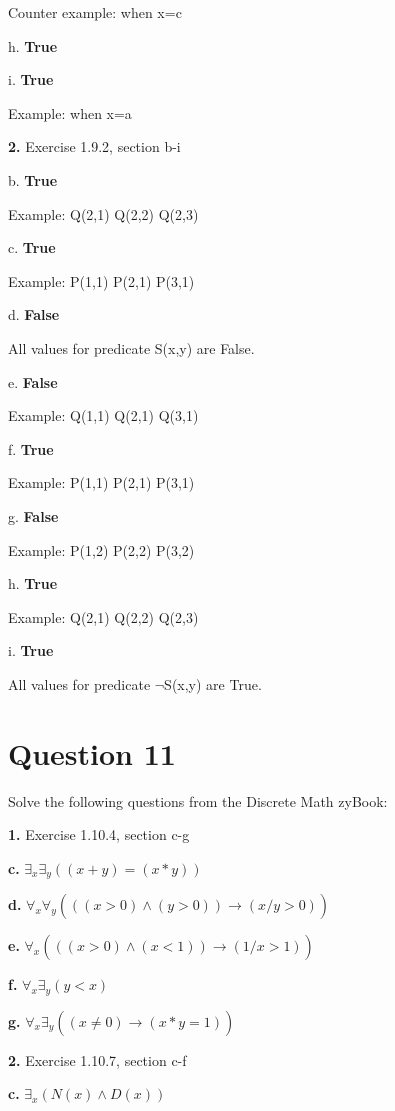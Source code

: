 \documentclass[11pt]{article}
\begin{document}
	Counter example: when x=c
	
	h. \textbf{True}
	
	i. \textbf{True}
	
	Example: when x=a
	
	\vspace{18mm}
	\textbf{2.} Exercise 1.9.2, section b-i
	\medskip
	
	b. \textbf{True}
	
	Example: Q(2,1) Q(2,2) Q(2,3)
	
	c. \textbf{True}
	
	Example: P(1,1) P(2,1) P(3,1)
	
	d. \textbf{False}
	
	All values for predicate S(x,y) are False.
	
	e. \textbf{False}
	
	Example: Q(1,1) Q(2,1) Q(3,1)
	
	f. \textbf{True}
	
	Example: P(1,1) P(2,1) P(3,1)
	
	g. \textbf{False}
	
	Example: P(1,2) P(2,2) P(3,2)
	
	h. \textbf{True}
	
	Example: Q(2,1) Q(2,2) Q(2,3)
	
	i. \textbf{True}
	
	All values for predicate $\neg$S(x,y) are True.
	
	\newpage
	\section*{Question 11}
	Solve the following questions from the Discrete Math zyBook:
	
	\textbf{1.} Exercise 1.10.4, section c-g
	\medskip
	
	\textbf{c.}
	$\exists_x \exists_y ((x+y)=(x*y))$
	
	\textbf{d.}
	$\forall_x \forall_y (((x>0)\wedge (y>0))\xrightarrow[]{}(x/y > 0))$
	
	\textbf{e.}
	$\forall_x (((x>0)\wedge (x<1))\xrightarrow[]{}(1/x > 1))$
	
	\textbf{f.}
	$\forall_x \exists_y (y<x)$
	
	\textbf{g.}
	$\forall_x \exists_y ((x\neq 0)\xrightarrow[]{}(x*y=1))$
	
	\vspace{3mm}
	\textbf{2.} Exercise 1.10.7, section c-f
	\medskip
	
	\textbf{c.}
	$\exists_x (N(x)\wedge D(x))$
	
\end{document}
